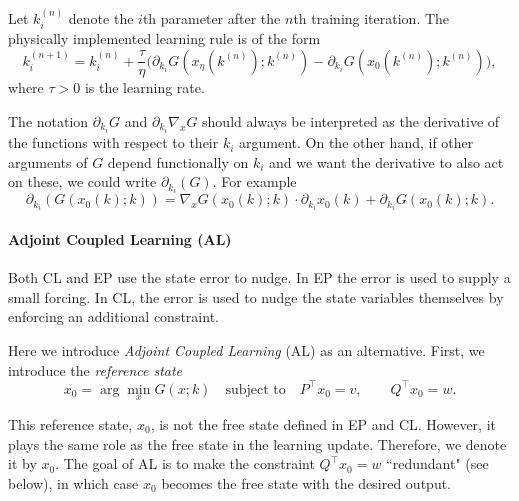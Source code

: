 \documentclass{siamart}
\begin{document}
Let $k_i^{(n)}$ denote the $i$th parameter after the $n$th training iteration.
The physically implemented learning rule is of the form
\[
    k_i^{(n+1)} 
    = k_i^{(n)}
      + \dfrac{\tau}{\eta}\big(
      \partial_{k_i}G(x_\eta(k^{(n)});k^{(n)})
           - \partial_{k_i}G(x_0(k^{(n)});k^{(n)}) \big),
\]
where $\tau>0$ is the learning rate.
\begin{remark}
    The notation $\partial_{k_i}G$ and $\partial_{k_i}\nabla_xG$ should always be interpreted as the derivative of the functions with respect to their $k_i$ argument. On the other hand, if other arguments of $G$ depend functionally on $k_i$ and we want the derivative to also act on these, we could write $\partial_{k_i}(G)$. For example
    \[
    \partial_{k_i}(G(x_0(k);k)) = \nabla_{x}G(x_0(k);k) \cdot \partial_{k_i}x_0(k) + \partial_{k_i}G(x_0(k);k).
\]
\end{remark}

\paragraph{Adjoint Coupled Learning (AL)}
Both CL and EP use the state error to nudge. In EP the error is used to supply a small forcing. In CL, the error is used to nudge the state variables themselves by enforcing an additional constraint. 

Here we introduce \textit{Adjoint Coupled Learning} (AL) as an alternative. First, we introduce the \textit{reference state}
\begin{equation}
    x_0
    = \arg\min_{x} G(x;k)
    \quad\text{subject to}\quad
    P^\top x_0 = v, 
    \qquad 
    Q^\top x_0 = w .
    \label{eq:AL}
\end{equation}

\begin{remark}
    This reference state, $x_0$, is not the free state defined in EP and CL. However, it plays the same role as the free state in the learning update. Therefore, we denote it by $x_0$. The goal of AL is to make the constraint $Q^\top x_0=w$ ``redundant" (see below), in which case $x_0$ becomes the free state with the desired output.
\end{remark}
\end{document}
